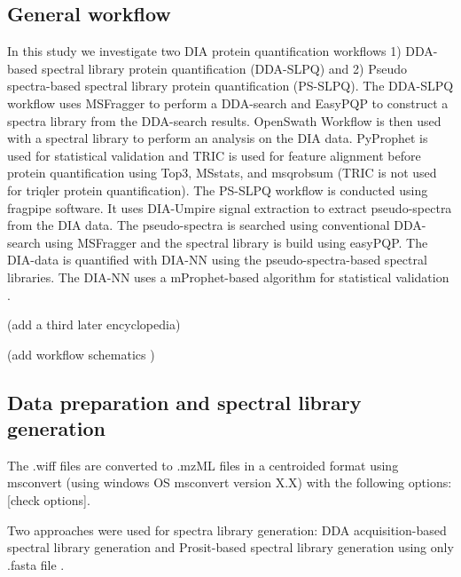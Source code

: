 \documentclass[10pt,letterpaper]{article}
\begin{document}
\subsection*{General workflow}
In this study we investigate two DIA protein quantification workflows 1) DDA-based spectral library protein quantification (DDA-SLPQ) and 2) Pseudo spectra-based spectral library protein quantification (PS-SLPQ). The DDA-SLPQ workflow uses MSFragger to perform a DDA-search and EasyPQP to construct a spectra library from the DDA-search results. OpenSwath Workflow is then used with a spectral library to perform an analysis on the DIA data. PyProphet is used for statistical validation and TRIC is used for feature alignment before protein quantification using Top3, MSstats, and msqrobsum (TRIC is not used for triqler protein quantification). The PS-SLPQ workflow is conducted using fragpipe software. It uses DIA-Umpire signal extraction to extract pseudo-spectra from the DIA data. The pseudo-spectra is searched using conventional DDA-search using MSFragger and the spectral library is build using easyPQP. The DIA-data is quantified with DIA-NN using the pseudo-spectra-based spectral libraries. The DIA-NN uses a mProphet-based algorithm for statistical validation \cite{reiter2011mprophet} \cite{demichev2020dia}. 

(add a third later encyclopedia) 

(add workflow schematics )

\subsection*{Data preparation and spectral library generation}
The .wiff files are converted to .mzML files in a centroided format using msconvert (using windows OS msconvert version X.X) with the following options: [check options]. 

Two approaches were used for spectra library generation: DDA acquisition-based spectral library generation and Prosit-based spectral library generation using only .fasta file \cite{searle2020generating}. 
\end{document}
